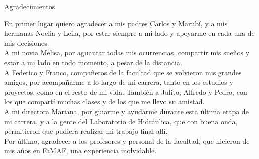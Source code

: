 
\begin{seccion}
{Agradecimientos}

En primer lugar quiero agradecer a mis padres Carlos y Marubí, y a mis hermanas Noelia y Leila, por estar siempre a mi lado y apoyarme en cada una de mis decisiones. \\
A mi novia Melisa, por aguantar todas mis ocurrencias, compartir mis sueños y estar a mi lado en todo momento, a pesar de la distancia. \\
A Federico y Franco, compañeros de la facultad que se volvieron mis grandes amigos, por acompañarme a lo largo de mi carrera, tanto en los estudios y proyectos, como en el resto de mi vida. También a Julito, Alfredo y Pedro, con los que compartí muchas clases y de los que me llevo su amistad. \\
A mi directora Mariana, por guiarme y ayudarme durante esta última etapa de mi carrera, y a la gente del Laboratorio de Hidráulica, que con buena onda, permitieron que pudiera realizar mi trabajo final allí. \\
Por último, agradecer a los profesores y personal de la facultad, que hicieron de mis años en FaMAF, una experiencia inolvidable.

\end{seccion}
